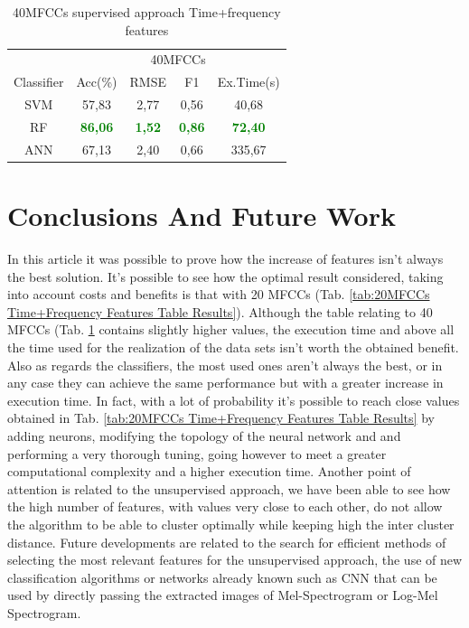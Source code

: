 \documentclass[conference]{IEEEtran}
\begin{document}
\begin{table}[!ht]
    \centering
    \caption{40MFCCs supervised approach Time+frequency features}
    \label{tab:40MFCCs Time+Frequency Features Table Results}
    \begin{tabular}{c c c c c}
    \toprule
    &\multicolumn{4}{c}{40MFCCs}\\
    \cmidrule{2-5}
        Classifier  &Acc(\%) &RMSE &F1 &Ex.Time(s)\\
    \midrule 
        SVM             &57,83 &2,77 &0,56 &40,68\\    
        RF              &\textcolor{green}{\textbf{86,06}}&\textcolor{green}{\textbf{1,52}}
                        &\textcolor{green}{\textbf{0,86}}&\textcolor{green}{\textbf{72,40}}\\
        ANN             &67,13 &2,40 &0,66 &335,67\\
    \bottomrule
    \end{tabular}
\end{table}

\section{Conclusions And Future Work}
\noindent
In this article it was possible to prove how the increase of features isn't always the best solution. It's possible to see how the optimal result considered, taking into account costs and benefits is that with 20 MFCCs (Tab. \ref{tab:20MFCCs Time+Frequency Features Table Results}). Although the table relating to 40 MFCCs (Tab. \ref{tab:40MFCCs Time+Frequency Features Table Results} contains slightly higher values, the execution time and above all the time used for the realization of the data sets isn't worth the obtained benefit. Also as regards the classifiers, the most used ones aren't always the best, or in any case they can achieve the same performance but with a greater increase in execution time. In fact, with a lot of probability it's possible to reach close values obtained in Tab. \ref{tab:20MFCCs Time+Frequency Features Table Results} by adding neurons, modifying the topology of the neural network and and performing a very thorough tuning, going however to meet a greater computational complexity and a higher execution time. Another point of attention is related to the unsupervised approach, we have been able to see how the high number of features, with values very close to each other, do not allow the algorithm to be able to cluster optimally while keeping high the inter cluster distance. Future developments are related to the search for efficient methods of selecting the most relevant features for the unsupervised approach, the use of new classification algorithms or networks already known such as CNN that can be used by directly passing the extracted images of Mel-Spectrogram or Log-Mel Spectrogram.

\noindent


\end{document}
